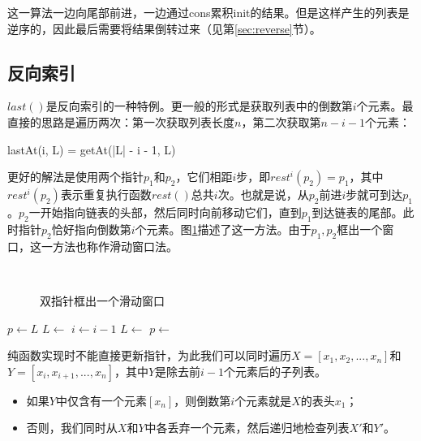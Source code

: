 \documentclass[b5paper]{ctexart}
\begin{document}
这一算法一边向尾部前进，一边通过cons累积init的结果。但是这样产生的列表是逆序的，因此最后需要将结果倒转过来（见第\ref{sec:reverse}节）。

\subsection{反向索引}
 

$last()$是反向索引的一种特例。更一般的形式是获取列表中的倒数第$i$个元素。最直接的思路是遍历两次：第一次获取列表长度$n$，第二次获取第$n - i - 1$个元素：

\be
  lastAt(i, L) = getAt(|L| - i - 1, L)
\ee

更好的解法是使用两个指针$p_1$和$p_2$，它们相距$i$步，即$rest^i(p_2) = p_1$，其中$rest^i(p_2)$表示重复执行函数$rest()$总共$i$次。也就是说，从$p_2$前进$i$步就可到达$p_1$。$p_2$一开始指向链表的头部，然后同时向前移动它们，直到$p_1$到达链表的尾部。此时指针$p_2$恰好指向倒数第$i$个元素。图\ref{fig:list-rindex}描述了这一方法。由于$p_1, p_2$框出一个窗口，这一方法也称作滑动窗口法。

\begin{figure}[htbp]
    \centering
     \\
    \caption{双指针框出一个滑动窗口}
    \label{fig:list-rindex}
\end{figure}

\begin{algorithmic}[1]
  \State $p \gets L$
    \State $L \gets $  
    \State $i \gets i - 1$
  \EndWhile
    \State $L \gets$ 
    \State $p \gets$ 
  \EndWhile
  \State \Return {}
\EndFunction
\end{algorithmic}

纯函数实现时不能直接更新指针，为此我们可以同时遍历$X = [x_1, x_2, ..., x_n]$和$Y = [x_i, x_{i+1}, ..., x_n]$，其中$Y$是除去前$i-1$个元素后的子列表。

\begin{itemize}
\item 如果$Y$中仅含有一个元素$[x_n]$，则倒数第$i$个元素就是$X$的表头$x_1$；
\item 否则，我们同时从$X$和$Y$中各丢弃一个元素，然后递归地检查列表$X'$和$Y'$。
\end{itemize}
\end{document}
